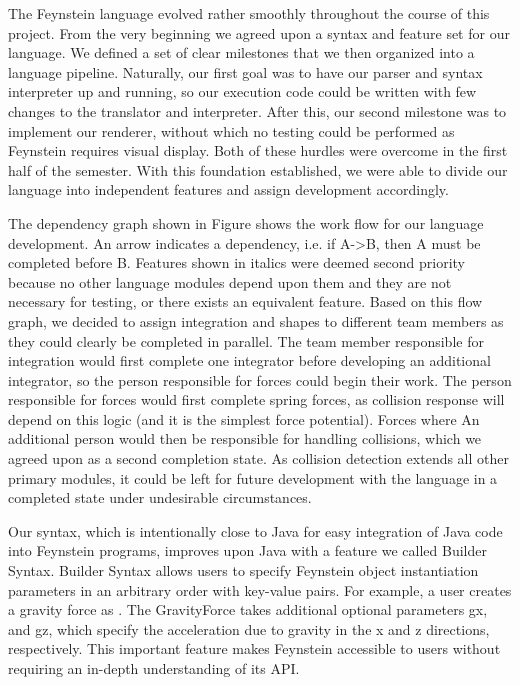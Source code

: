 The Feynstein language evolved rather smoothly throughout the course
of this project. From the very beginning we agreed upon a syntax and
feature set for our language. We defined a set of clear milestones
that we then organized into a language pipeline. Naturally, our first
goal was to have our parser and syntax interpreter up and running, so
our execution code could be written with few changes to the translator
and interpreter. After this, our second milestone was to implement our
renderer, without which no testing could be performed as Feynstein
requires visual display. Both of these hurdles were overcome in the
first half of the semester. With this foundation established, we were
able to divide our language into independent features and assign
development accordingly.

The dependency graph shown in Figure  shows the work
flow for our language development. An arrow indicates a dependency,
i.e. if A->B, then A must be completed before B. Features shown in
italics were deemed second priority because no other language modules
depend upon them and they are not necessary for testing, or there
exists an equivalent feature. Based on this flow graph, we decided to
assign integration and shapes to different team members as they could
clearly be completed in parallel. The team member responsible for
integration would first complete one integrator before developing an
additional integrator, so the person responsible for forces could
begin their work. The person responsible for forces would first
complete spring forces, as collision response will depend on this
logic (and it is the simplest force potential). Forces where An
additional person would then be responsible for handling collisions,
which we agreed upon as a second completion state. As collision
detection extends all other primary modules, it could be left for
future development with the language in a completed state under
undesirable circumstances.


Our syntax, which is intentionally close to Java for easy integration
of Java code into Feynstein programs, improves upon Java with a
feature we called Builder Syntax. Builder Syntax allows users to
specify Feynstein object instantiation parameters in an arbitrary
order with key-value pairs. For example, a user creates a gravity
force as . The GravityForce takes
additional optional parameters gx, and gz, which specify the
acceleration due to gravity in the x and z directions,
respectively. This important feature makes Feynstein accessible to
users without requiring an in-depth understanding of its API.

